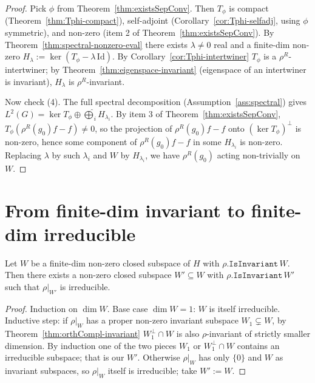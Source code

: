 \begin{proof}
  Pick $\phi$ from Theorem~\ref{thm:existsSepConv}.
  Then $T_\phi$ is compact (Theorem~\ref{thm:Tphi-compact}),
  self-adjoint (Corollary~\ref{cor:Tphi-selfadj}, using $\phi$
  symmetric), and non-zero (item 2 of Theorem~\ref{thm:existsSepConv}).
  By Theorem~\ref{thm:spectral-nonzero-eval} there exists
  $\lambda \neq 0$ real and a finite-dim non-zero
  $H_\lambda := \ker(T_\phi - \lambda\,\mathrm{Id})$.
  By Corollary~\ref{cor:Tphi-intertwiner} $T_\phi$ is a $\rho^R$-intertwiner;
  by Theorem~\ref{thm:eigenspace-invariant} (eigenspace of an
  intertwiner is invariant), $H_\lambda$ is $\rho^R$-invariant.

  Now check (4). The full spectral decomposition
  (Assumption~\ref{ass:spectral}) gives
  $L^2(G) = \ker T_\phi \oplus \widehat{\bigoplus}_i H_{\lambda_i}$.
  By item 3 of Theorem~\ref{thm:existsSepConv},
  $T_\phi(\rho^R(g_0) f - f) \neq 0$, so the projection of
  $\rho^R(g_0) f - f$ onto $(\ker T_\phi)^\perp$ is non-zero, hence
  some component of $\rho^R(g_0) f - f$ in some $H_{\lambda_i}$ is
  non-zero. Replacing $\lambda$ by such $\lambda_i$ and $W$ by $H_{\lambda_i}$,
  we have $\rho^R(g_0)$ acting non-trivially on $W$.
\end{proof}

\section{From finite-dim invariant to finite-dim irreducible}

\begin{theorem}
  \label{thm:fd-contains-irr}
  \leanok
  Let $W$ be a finite-dim non-zero closed subspace of $H$ with
  $\rho.\texttt{IsInvariant}\,W$. Then there exists a non-zero closed
  subspace $W' \subseteq W$ with $\rho.\texttt{IsInvariant}\,W'$ such
  that $\rho|_{W'}$ is irreducible.
\end{theorem}

\begin{proof}
  Induction on $\dim W$. Base case $\dim W = 1$: $W$ is itself
  irreducible. Inductive step: if $\rho|_W$ has a proper non-zero
  invariant subspace $W_1 \subsetneq W$, by Theorem~\ref{thm:orthCompl-invariant}
  $W_1^\perp \cap W$ is also $\rho$-invariant of strictly smaller
  dimension. By induction one of the two pieces $W_1$ or
  $W_1^\perp \cap W$ contains an irreducible subspace; that is our
  $W'$. Otherwise $\rho|_W$ has only $\{0\}$ and $W$ as invariant
  subspaces, so $\rho|_W$ itself is irreducible; take $W' := W$.
\end{proof}

